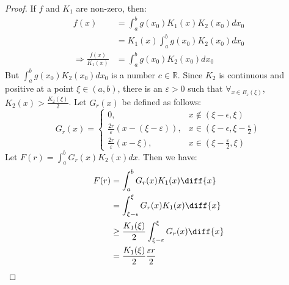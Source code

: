         \begin{proof}
            If $f$ and $K_{1}$ are non-zero, then:
            \begin{subequations}
                \begin{align}
                    f(x)&=\int_{a}^{b}g(x_{0})K_{1}(x)
                         K_{2}(x_{0})dx_{0}\\
                    &=K_{1}(x)\int_{a}^{b}g(x_{0})
                         K_{2}(x_{0})dx_{0}\\
                    \Longrightarrow
                    \frac{f(x)}{K_{1}(x)}
                    &=\int_{a}^{b}g(x_{0})K_{2}(x_{0})dx_{0}
                \end{align}
            \end{subequations}
            But $\int_{a}^{b}g(x_{0})K_{2}(x_{0})dx_{0}$ is a
            number $c\in\mathbb{R}$. Since $K_{2}$ is continuous
            and positive at a point $\xi\in(a,b)$, there is an
            $\varepsilon>0$ such that
            $\forall_{x\in B_{\varepsilon}(\xi)}$,
            $K_{2}(x)>\frac{K_{2}(\xi)}{2}$.
            Let $G_{r}(x)$ be defined as follows:
            \begin{equation}
                G_{r}(x)=
                    \begin{cases}
                        0,&x\notin(\xi-\epsilon,\xi)\\
                        \frac{2r}{\varepsilon}(x-(\xi-\varepsilon)),
                        &x\in(\xi-\epsilon,\xi-\frac{\epsilon}{2})\\
                        \frac{2r}{\varepsilon}(x-\xi),&
                        x\in(\xi-\frac{\varepsilon}{2},\xi)
                    \end{cases}
            \end{equation}
            Let $F(r)=\int_{a}^{b}G_{r}(x)K_{2}(x)dx$.
            Then we have:
            \begin{subequations}
                \begin{align}
                    F(r)&=\int_{a}^{b}G_{r}(x)K_{1}(x)\diff{x}\\
                        &=\int_{\xi-\epsilon}^{\xi}G_{r}(x)K_{1}(x)\diff{x}\\
                    &\geq\frac{K_{1}(\xi)}{2}
                        \int_{\xi-\varepsilon}^{\xi}G_{r}(x)\diff{x}\\
                    &=\frac{K_{1}(\xi)}{2}\frac{\varepsilon r}{2}
                \end{align}

\end{subequations}
\end{proof}
